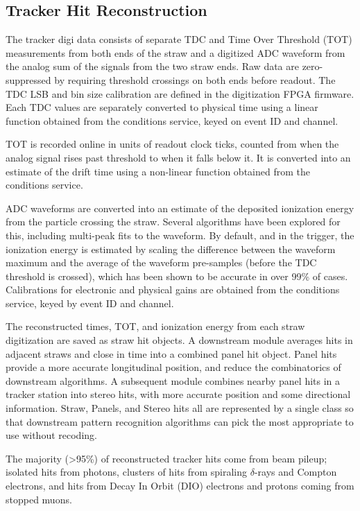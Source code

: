 \subsection{Tracker Hit Reconstruction}
The tracker digi data consists of separate TDC and Time Over Threshold (TOT) measurements from both ends of the straw and a digitized ADC waveform from the analog sum of the signals from the two straw ends. Raw data are zero-suppressed by requiring threshold crossings on both ends before readout. The TDC LSB and bin size calibration are defined in the digitization FPGA firmware. Each TDC values are separately converted to physical time using a linear function obtained from the conditions service, keyed on event ID and channel.
 
TOT is recorded online in units of readout clock ticks, counted from when the analog signal rises past threshold to when it falls below it. It is converted into an estimate of the drift time using a non-linear function obtained from the conditions service.
 
ADC waveforms are converted into an estimate of the deposited ionization energy from the particle crossing the straw. Several algorithms have been explored for this, including multi-peak fits to the waveform. By default, and in the trigger, the ionization energy is estimated by scaling the difference between the waveform maximum and the average of the waveform pre-samples (before the TDC threshold is crossed), which has been shown to be accurate in over 99\% of cases. Calibrations for electronic and physical gains are obtained from the conditions service, keyed by event ID and channel.

The reconstructed times, TOT, and ionization energy from each straw digitization are saved as straw hit objects. A downstream module averages hits in adjacent straws and close in time into a combined panel hit object. Panel hits provide a more accurate longitudinal position, and reduce the combinatorics of downstream algorithms. A subsequent module combines nearby panel hits in a tracker station into stereo hits, with more accurate position and some directional information. Straw, Panels, and Stereo hits all are represented by a single class so that downstream pattern recognition algorithms can pick the most appropriate to use without recoding.

The majority (>95\%) of reconstructed tracker hits come from beam pileup; isolated hits from photons, clusters of hits from spiraling $\delta$-rays and Compton electrons, and hits from Decay In Orbit (DIO) electrons and protons coming from stopped muons. 

